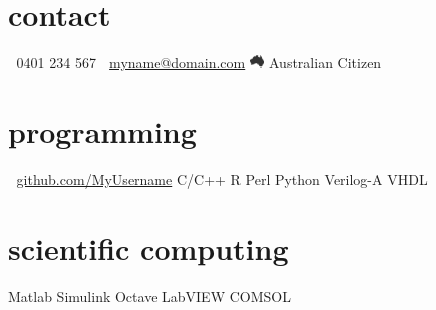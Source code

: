 \documentclass{friggeriEOSG-cv}
\begin{document}




\begin{aside} %
\section{contact}
\vspace{1.5em}
\textcolor{darkgray}{\faPhone} $\;$ 0401 234 567 
\vspace{1.0em}
\textcolor{darkgray}{\faEnvelope}$\;$ \href{mailto:myname@domain.com}{myname@domain.com}
\vspace{1.0em}
\includegraphics[height=0.95em]{AUgray.png} Australian Citizen
\vspace{2.5em}

\section{programming}
\vspace{1.5em}
\textcolor{darkgray}{\faGithub}$\;$ \href{https://github.com/username}{github.com/MyUsername}
\vspace{1.0em}
C/C++
\vspace{1.0em}
R
\vspace{1.0em}
Perl
\vspace{1.0em}
Python
\vspace{1.0em}
Verilog-A
\vspace{1.0em}
VHDL
\vspace{2.5em}

\section{scientific computing}
\vspace{1.5em}
Matlab
\vspace{1.0em}
Simulink
\vspace{1.0em}
Octave
\vspace{1.0em}
LabVIEW
\vspace{1.0em}
COMSOL
\vspace{2.5em}


\end{aside}
\end{document}
